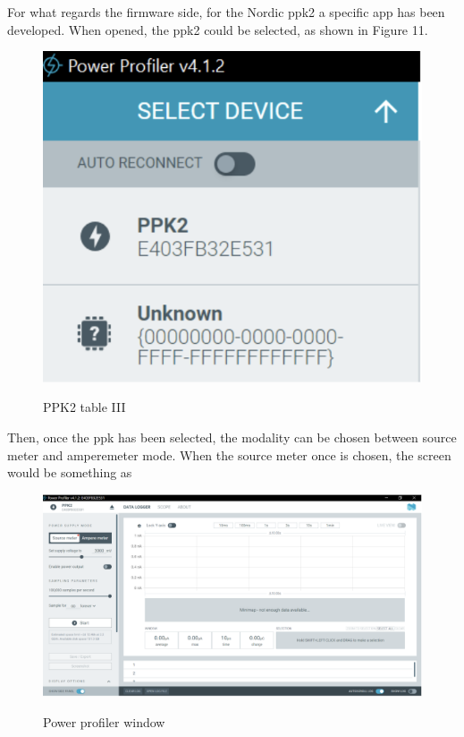 \documentclass{Configuration_Files/PoliMi3i_thesis}
\begin{document}
For what regards the firmware side, for the Nordic ppk2 a specific app has been developed. When opened, the ppk2 could be selected, as shown in Figure 11.
\begin{figure}[H]
    \centering
    \includegraphics[scale=0.6]{Test_Procedure/11.png}
    \label{direct_communication_board_PC_11}
    \caption{PPK2 table III}
\end{figure}

Then, once the ppk has been selected, the modality can be chosen between source meter and amperemeter mode. 
When the source meter once is chosen, the screen would be something as 
\begin{figure}[H]
    \centering
    \includegraphics[scale=0.6]{Test_Procedure/12.png}
    \label{direct_communication_board_PC_12}
    \caption{Power profiler window}
\end{figure}
\end{document}
